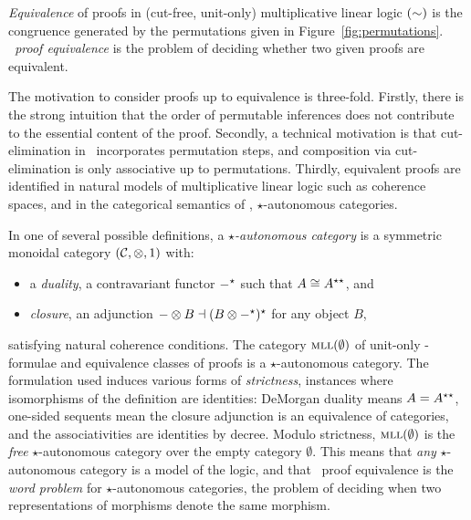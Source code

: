 \begin{definition}
\label{def:equivalence}
%
\emph{Equivalence} of proofs in (cut-free, unit-only) multiplicative linear logic $(\sim)$ is the congruence generated by the permutations given in Figure~\ref{fig:permutations}.
%
\emph{\MLL\ proof equivalence} is the problem of deciding whether two given proofs are equivalent.
%
\end{definition}



The motivation to consider proofs up to equivalence is three-fold.
%
Firstly, there is the strong intuition that the order of permutable inferences does not contribute to the essential content of the proof.
%
Secondly, a technical motivation is that cut-elimination in \MLL\ incorporates permutation steps, and composition via cut-elimination is only associative up to permutations.
%
Thirdly, equivalent proofs are identified in natural models of multiplicative linear logic such as coherence spaces, and in the categorical semantics of \MLL, $\star$-autonomous categories.



In one of several possible definitions, a \emph{$\star$-autonomous category} \citep{Barr-1979} is a symmetric monoidal category $(\mathcal C,\otimes,1)$ with:
%
\begin{itemize}
	
	\item
	a \emph{duality}, a contravariant functor $\dual-$ such that $A\cong\dual*A$, and

	\item
	\emph{closure}, an adjunction $-\tn B \dashv \dual{(B\tn\dual-)}$ for any object $B$,

\end{itemize}
%
satisfying natural coherence conditions.
%
The category $\textsc{mll}(\emptyset)$ of unit-only \MLL-formulae and equivalence classes of proofs is a $\star$-autonomous category.
%
The formulation used induces various forms of \emph{strictness}, instances where isomorphisms of the definition are identities: DeMorgan duality means $A=\dual*A$, one-sided sequents mean the closure adjunction is an equivalence of categories, and the associativities are identities by decree.
%
Modulo strictness, $\textsc{mll}(\emptyset)$ is the \emph{free} $\star$-autonomous category over the empty category $\emptyset$.
%
This means that \emph{any} $\star$-autonomous category is a model of the logic, and that \MLL\ proof equivalence is the \emph{word problem} for $\star$-autonomous categories, the problem of deciding when two representations of morphisms denote the same morphism.




